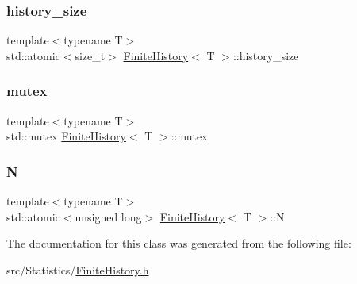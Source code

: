 \mbox{\label{class_finite_history_aa744ad1f9f0ef54fbd575eef672adc08}} 
\subsubsection{\texorpdfstring{history\+\_\+size}{history\_size}}
{\footnotesize\ttfamily template$<$typename T$>$ \\
std\+::atomic$<$size\+\_\+t$>$ \hyperlink{class_finite_history}{Finite\+History}$<$ T $>$\+::history\+\_\+size}

\mbox{\label{class_finite_history_a677c5c1c7115d5c8c8381aa4332025c6}} 
\subsubsection{\texorpdfstring{mutex}{mutex}}
{\footnotesize\ttfamily template$<$typename T$>$ \\
std\+::mutex \hyperlink{class_finite_history}{Finite\+History}$<$ T $>$\+::mutex\hspace{0.3cm}{\ttfamily [mutable]}}

\mbox{\label{class_finite_history_a5967a95efc3ef8aa4391942da511eab7}} 
\subsubsection{\texorpdfstring{N}{N}}
{\footnotesize\ttfamily template$<$typename T$>$ \\
std\+::atomic$<$unsigned long$>$ \hyperlink{class_finite_history}{Finite\+History}$<$ T $>$\+::N}



The documentation for this class was generated from the following file\+:\begin{DoxyCompactItemize}
\item 
src/\+Statistics/\hyperlink{_finite_history_8h}{Finite\+History.\+h}\end{DoxyCompactItemize}
